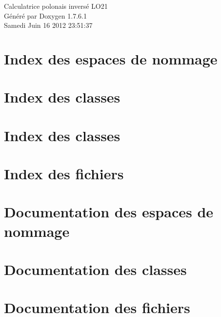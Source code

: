 \documentclass[a4paper]{book}
\begin{document}
\hypersetup{pageanchor=false,citecolor=blue}
\begin{titlepage}
\vspace*{7cm}
\begin{center}
{\Large \-Calculatrice polonais inversé \-L\-O21 }\\
\vspace*{1cm}
{\large \-Généré par Doxygen 1.7.6.1}\\
\vspace*{0.5cm}
{\small Samedi Juin 16 2012 23:51:37}\\
\end{center}
\end{titlepage}
\clearemptydoublepage
{}
\tableofcontents
\clearemptydoublepage
{}
\hypersetup{pageanchor=true,citecolor=blue}
\chapter{\-Index des espaces de nommage}

\chapter{\-Index des classes}

\chapter{\-Index des classes}

\chapter{\-Index des fichiers}

\chapter{\-Documentation des espaces de nommage}

\chapter{\-Documentation des classes}













\chapter{\-Documentation des fichiers}


























\printindex
\end{document}
